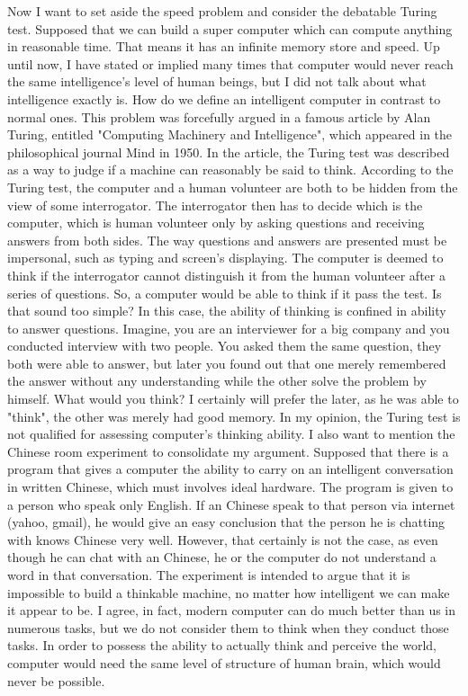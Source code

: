 \documentclass[11pt]{article}
\begin{document}
Now I want to set aside the speed problem and consider the debatable Turing test. Supposed that we can build a super computer which can compute anything in reasonable time. That means it has an infinite memory store and speed. Up until now, I have stated or implied many times that computer would never reach the same intelligence's level of human beings, but I did not talk about what intelligence exactly is. How do we define an intelligent computer in contrast to normal ones. This problem was forcefully argued in a famous article by Alan Turing, entitled "Computing Machinery and Intelligence", which appeared in the philosophical journal Mind in 1950. In the article, the Turing test was described as a way to judge if a machine can reasonably be said to think. According to the Turing test, the computer and a human volunteer are both to be hidden from the view of some interrogator. The interrogator then has to decide which is the computer, which is human volunteer only by asking questions and receiving answers from both sides. The way questions and answers are presented must be impersonal, such as typing and screen's displaying. The computer is deemed to think if the interrogator cannot distinguish it from the human volunteer after a series of questions. So, a computer would be able to think if it pass the test. Is that sound too simple? In this case, the ability of thinking is confined in ability to answer questions. Imagine, you are an interviewer for a big company and you conducted interview with two people. You asked them the same question, they both were able to answer, but later you found out that one merely remembered the answer without any understanding while the other solve the problem by himself. What would you think? I certainly will prefer the later, as he was able to "think", the other was merely had good memory. In my opinion, the Turing test is not qualified for assessing computer's thinking ability. I also want to mention the Chinese room experiment to consolidate my argument. Supposed that there is a program that gives a computer the ability to carry on an intelligent conversation in written Chinese, which must involves ideal hardware. The program is given to a person who speak only English. If an Chinese speak to that person via internet (yahoo, gmail), he would give an easy conclusion that the person he is chatting with knows Chinese very well. However, that certainly is not the case, as even though he can chat with an Chinese, he or the computer do not understand a word in that conversation. The experiment is intended to argue that it is impossible to build a thinkable machine, no matter how intelligent we can make it appear to be. I agree, in fact, modern computer can do much better than us in numerous tasks, but we do not consider them to think when they conduct those tasks. In order to possess the ability to actually think and perceive the world, computer would need the same level of structure of human brain, which would never be possible. \\
\end{document}
